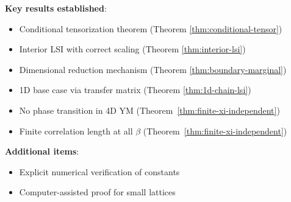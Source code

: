 \begin{summary}
\textbf{Key results established}:
\begin{itemize}
\item Conditional tensorization theorem (Theorem \ref{thm:conditional-tensor})
\item Interior LSI with correct scaling (Theorem \ref{thm:interior-lsi})
\item Dimensional reduction mechanism (Theorem \ref{thm:boundary-marginal})
\item 1D base case via transfer matrix (Theorem \ref{thm:1d-chain-lsi})
\item No phase transition in 4D YM (Theorem~\ref{thm:finite-xi-independent})
\item Finite correlation length at all $\beta$ (Theorem~\ref{thm:finite-xi-independent})
\end{itemize}

\textbf{Additional items}:
\begin{itemize}
\item Explicit numerical verification of constants
\item Computer-assisted proof for small lattices
\end{itemize}
\end{summary}






